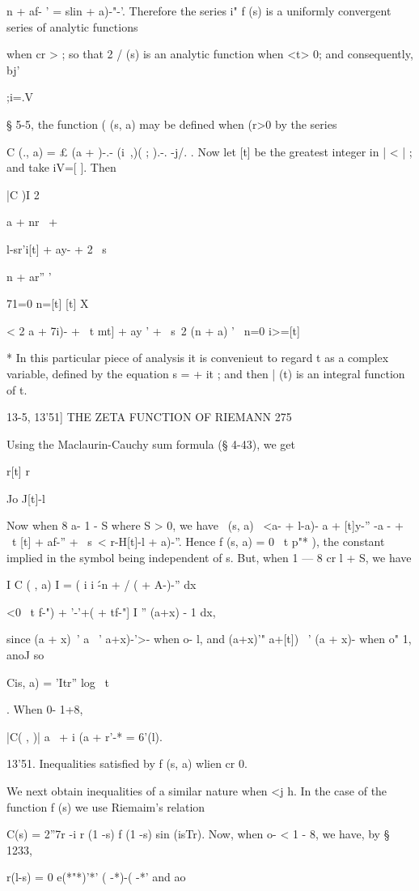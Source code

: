  n + af- ' = slin + a)-"-'. Therefore the series i" f (s) is a
uniformly convergent series of analytic functions

when cr > ; so that 2 / (s) is an analytic function when <t> 0; and
consequently, bj'

;i=.V

§ 5-5, the function ( (s, a) may be defined when (r>0 by the series

C (., a) = £ (a + )-.- (i\ ,)( ; ).-. -j/. . Now let [t] be the
greatest integer in | < | ; and take iV=[ ]. Then

|C )I 2 \ \ {a + nr \ + \ \ { l-sr'i[t] + ay- + 2 \ s\ \ {n + ar'' '

71=0 n=[t] [t] X

< 2 a + 7i)- + \ t mt] + ay ' + \ s\ 2 (n + a) ' \ n=0 i>=[t]

* In this particular piece of analysis it is convenieut to regard t as
a complex variable, defined by the equation s = + it ; and then | (t)
is an integral function of t.



13-5, 13'51] THE ZETA FUNCTION OF RIEMANN 275

Using the Maclaurin-Cauchy sum formula (§ 4-43), we get

r[t] r

Jo J[t]-l

Now when 8 a- 1 - S where S > 0, we have \ (s, a) \ <a- + l-a)- a +
[t]y-'' -a - + \ t [t] + af-'' + \ s\ < r-H[t]-l + a)-''. Hence f (s,
a) = 0 \ t p"* ), the constant implied in the symbol being independent
of s. But, when 1 — 8 cr l + S, we have

I C ( , a) I = ( i i \'-n + / ( + A-)-'' dx

<0 \ t f-") + '-'+( + tf-"] I '' (a+x) - 1 dx,

since (a + x)~' a ~' a+x)-'>- when o- l, and (a+x)'" a+[t]) ~' (a +
x)- when o" 1, anoJ so

Cis, a) = 'Itr'' log \ t\ \ }. When 0- 1+8,

|C( , )| a~ + i (a + r'-* = 6'(l).

13'51. Inequalities satisfied by f (s, a) wlien cr 0.

We next obtain inequalities of a similar nature when <j h. In the case
of the function f (s) we use Riemaim's relation

C(s) = 2''7r -i r (1 -s) f (1 -s) sin (isTr). Now, when o- < 1 - 8, we
have, by § 1233,

r(l-s) = 0 e(*"*)'*' ( -*)-( -*' and ao

}}
